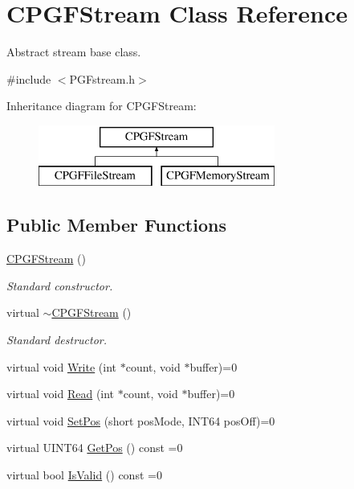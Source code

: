 \hypertarget{classCPGFStream}{}\section{C\+P\+G\+F\+Stream Class Reference}
\label{classCPGFStream}


Abstract stream base class.  




{\ttfamily \#include $<$P\+G\+Fstream.\+h$>$}

Inheritance diagram for C\+P\+G\+F\+Stream\+:\begin{figure}[H]
\begin{center}
\leavevmode
\includegraphics[height=2.000000cm]{classCPGFStream}
\end{center}
\end{figure}
\subsection*{Public Member Functions}
\begin{DoxyCompactItemize}
\item 
\mbox{\hyperlink{classCPGFStream_a2384e79147a1c375e00722b1ef038121}{C\+P\+G\+F\+Stream}} ()
\begin{DoxyCompactList}\small\item\em Standard constructor. \end{DoxyCompactList}\item 
virtual \mbox{\hyperlink{classCPGFStream_a32718570401ef16b8f778fa08cdb6a7a}{$\sim$\+C\+P\+G\+F\+Stream}} ()
\begin{DoxyCompactList}\small\item\em Standard destructor. \end{DoxyCompactList}\item 
virtual void \mbox{\hyperlink{classCPGFStream_a0a46ae977995134787219288f4123134}{Write}} (int $\ast$count, void $\ast$buffer)=0
\item 
virtual void \mbox{\hyperlink{classCPGFStream_afdc81fe9b4d2d962b8112e50eace95a2}{Read}} (int $\ast$count, void $\ast$buffer)=0
\item 
virtual void \mbox{\hyperlink{classCPGFStream_a69be67d4b04cd056c4f74d8147349a16}{Set\+Pos}} (short pos\+Mode, I\+N\+T64 pos\+Off)=0
\item 
virtual U\+I\+N\+T64 \mbox{\hyperlink{classCPGFStream_a841e109647ea77dd9e589ab00ef4aad8}{Get\+Pos}} () const =0
\item 
virtual bool \mbox{\hyperlink{classCPGFStream_abf99169c9bcf0feb57edc55cec215b95}{Is\+Valid}} () const =0
\end{DoxyCompactItemize}


